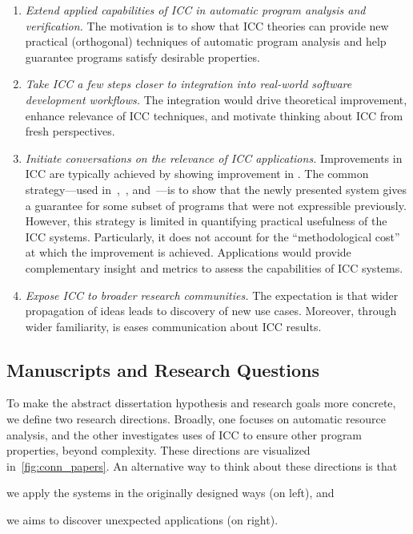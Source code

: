 \begin{enumerate}[label={\textbf{G\arabic*.}}]

\item\emph{Extend applied capabilities of ICC in automatic program analysis and verification.}
The motivation is to show that ICC theories can provide new practical (orthogonal) techniques of automatic program analysis and help guarantee programs satisfy desirable properties.

\item\emph{Take ICC a few steps closer to integration into real-world software development workflows.}
The integration would drive theoretical improvement, enhance relevance of ICC techniques, and motivate thinking about ICC from fresh perspectives.

\item \emph{Initiate conversations on the relevance of ICC applications.}
Improvements in ICC are typically achieved by showing improvement in .
The common strategy---used \eg in~\cite[p.16--17]{hainry2023},~\cite[p. 17]{jones2009}, and~\cite[p. 147]{feree2018}---is to show that the newly presented system gives a guarantee for some subset of programs that were not expressible previously.
However, this strategy is limited in quantifying practical usefulness of the ICC systems.
Particularly, it does not account for the \enquote{methodological cost} at which the improvement is achieved.
Applications would provide complementary insight and metrics to assess the capabilities of ICC systems.

\item \emph{Expose ICC to broader research communities.}
The expectation is that wider propagation of ideas leads to discovery of new use cases.
Moreover, through wider familiarity, is eases communication about ICC results.

\end{enumerate}

\subsection{Manuscripts and Research Questions}
\label{subsec:conn-papers}

To make the abstract dissertation hypothesis and research goals more concrete,
we define two research directions. Broadly, one focuses on automatic resource
analysis, and the other investigates uses of ICC to ensure other program
properties, beyond complexity. These directions are visualized
in~\autoref{fig:conn_papers}. An alternative way to think about these directions
is that
\begin{enumerate*}
\item we apply the systems in the originally designed ways (on left), and
\item we aims to discover unexpected applications (on right).
\end{enumerate*}

